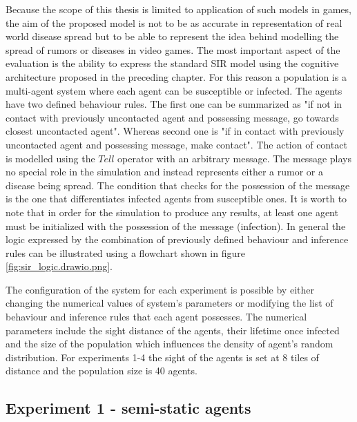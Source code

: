 Because the scope of this thesis is limited to application of such models in games, the aim of the proposed model is not to be as accurate in representation of real world disease spread but to be able to represent the idea behind modelling the spread of rumors or diseases in video games.
The most important aspect of the evaluation is the ability to express the standard SIR model using the cognitive architecture proposed in the preceding chapter.
For this reason a population is a multi-agent system where each agent can be susceptible or infected.
The agents have two defined behaviour rules.
The first one can be summarized as "if not in contact with previously uncontacted agent and possessing message, go towards closest uncontacted agent".
Whereas second one is "if in contact with previously uncontacted agent and possessing message, make contact".
The action of contact is modelled using the $Tell$ operator with an arbitrary message.
The message plays no special role in the simulation and instead represents either a rumor or a disease being spread.
The condition that checks for the possession of the message is the one that differentiates infected agents from susceptible ones.
It is worth to note that in order for the simulation to produce any results, at least one agent must be initialized with the possession of the message (infection).
In general the logic expressed by the combination of previously defined behaviour and inference rules can be illustrated using a flowchart shown in figure \ref{fig:sir_logic.drawio.png}.

The configuration of the system for each experiment is possible by either changing the numerical values of system's parameters or modifying the list of behaviour and inference rules that each agent possesses.
The numerical parameters include the sight distance of the agents, their lifetime once infected and the size of the population which influences the density of agent's random distribution.
For experiments 1-4 the sight of the agents is set at 8 tiles of distance and the population size is 40 agents.




\subsection{Experiment 1 - semi-static agents}

